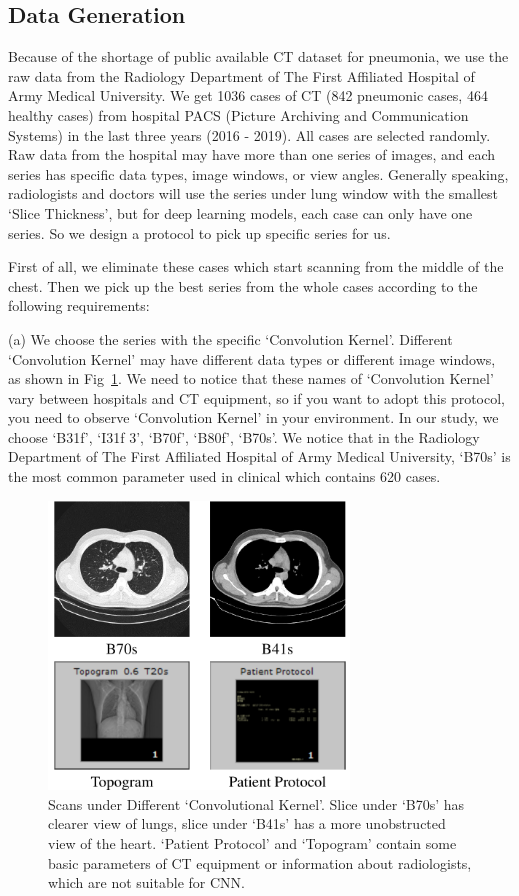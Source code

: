 \documentclass[journal]{IEEEtran}
\begin{document}
\subsection{Data Generation}
\label{ctimagedata}
Because of the shortage of public available CT dataset for pneumonia, we use the raw data from the Radiology Department of The First Affiliated Hospital of Army Medical University. We get 1036 cases of CT (842 pneumonic cases, 464 healthy cases) from hospital PACS (Picture Archiving and Communication Systems) in the last three years (2016 - 2019). All cases are selected randomly.
Raw data from the hospital may have more than one series of images, and each series has specific data types, image windows, or view angles. 
Generally speaking, radiologists and doctors will use the series under lung window with the smallest `Slice Thickness', but for deep learning models, each case can only have one series. So we design a protocol to pick up specific series for us.

First of all, we eliminate these cases which start scanning from the middle of the chest. Then we pick up the best series from the whole cases according to the following requirements:

(a) We choose the series with the specific `Convolution Kernel'. Different `Convolution Kernel' may have different data types or different image windows, as shown in Fig~\ref{Bs}. We need to notice that these names of `Convolution Kernel' vary between hospitals and CT equipment, so if you want to adopt this protocol, you need to observe `Convolution Kernel' in your environment. In our study, we choose `B31f', `I31f 3', `B70f', `B80f', `B70s'. We notice that in the Radiology Department of The First Affiliated Hospital of Army Medical University, `B70s' is the most common parameter used in clinical which contains 620 cases.

\begin{figure}[t]
    \centerline{\includegraphics[width=80mm]{Bs.pdf}}
    \vspace{-0cm}
    \caption{Scans under Different `Convolutional Kernel'. Slice under `B70s' has clearer view of lungs, slice under `B41s' has a more unobstructed view of the heart. `Patient Protocol' and `Topogram' contain some basic parameters of CT equipment or information about radiologists, which are not suitable for CNN.}
    \vspace{-0cm}
    \label{Bs}
    \end{figure}
\end{document}
